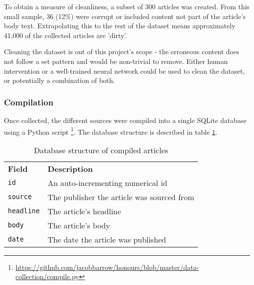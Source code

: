 To obtain a measure of cleanliness, a subset of 300 articles was created. From this small sample, 36 (12\%) were corrupt or included content not part of the article's body text. Extrapolating this to the rest of the dataset means approximately 41,000 of the collected articles are 'dirty'. 

Cleaning the dataset is out of this project's scope - the erroneous content does not follow a set pattern and would be non-trivial to remove. Either human intervention or a well-trained neural network could be used to clean the dataset, or potentially a combination of both.

\subsubsection{Compilation}\label{data-compilation}
Once collected, the different sources were compiled into a single SQLite database using a Python script \footnote{\url{https://github.com/jacobbarrow/honours/blob/master/data-collection/compile.py}}. The database structure is described in table \ref{tab:data-compilation}.

\begin{table}[h]
\begin{tabular}{ll}
\textbf{Field} & \textbf{Description} \\
\texttt{id} & An auto-incrementing numerical id \\
\texttt{source} & The publisher the article was sourced from \\
\texttt{headline} & The article's headline \\
\texttt{body} & The article's body \\
\texttt{date} & The date the article was published \\
\end{tabular}
\caption{Database structure of compiled articles}
\label{tab:data-compilation}
\end{table}

